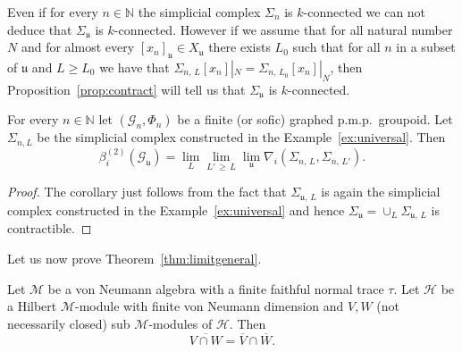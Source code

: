 \documentclass[AHL,Unicode,longabstracts,published]{cedram}
\newcommand{\Nmath}{\mathbb{N}}
\newcommand{\cM}{\mathcal{M}}
\newcommand{\cH}{\mathcal{H}}
\newcommand{\cg}{\mathcal{G}}
\newcommand{\uu}{\mathfrak{u}}
\newcommand{\ul}{\mathfrak{u}}
\newcommand{\pmp}{p.m.p.\ }
\begin{document}
\begin{rema}
Even if for every $n\in\Nmath$ the simplicial complex $\Sigma_n$ is $k$-connected we can not deduce that $\Sigma_\ul$ is $k$-connected. However if we assume that for all natural number $N$ and for almost every $[x_n]_\ul\in X_\ul$ there exists $L_0$ such that for all $n$ in a subset of $\ul$ and $L\geq L_0$ we have that $\Sigma_{n,\,L}[x_n]|_N=\Sigma_{n,\,L_0}[x_n]|_N$, then Proposition~\ref{prop:contract} will tell us that $\Sigma_\ul$ is $k$-connected.
\end{rema}

\begin{coro}
For every $n\in\Nmath$ let $(\cg_n,\Phi_n)$ be a finite (or sofic) graphed \pmp groupoid. Let $\Sigma_{n,L}$ be the simplicial complex constructed in the Example~\ref{ex:universal}. Then
\[
\beta^{(2)}_i(\cg_\ul) = \lim_{L} \lim_{L'\,\geq\,L} \lim_\uu \nabla_i\left(\Sigma_{n,\,L},\Sigma_{n,\,L'}\right).
\]
\end{coro}
\begin{proof}
The corollary just follows from the fact that $\Sigma_{\ul,\,L}$ is again the simplicial complex constructed in the Example~\ref{ex:universal} and hence $\Sigma_\ul=\cup_L\Sigma_{\ul,\,L}$ is contractible.
\end{proof}

Let us now prove Theorem~\ref{thm:limitgeneral}.

\begin{lemm}\label{lem:vNdimension}
Let $\cM$ be a von Neumann algebra with a finite faithful normal trace $\tau$. Let $\cH$ be a Hilbert $\cM$-module with finite von Neumann dimension and $V,W$ (not necessarily closed) sub $\cM$-modules of $\cH$. Then
\[
\overline{V \cap W} = \overline{V} \cap \overline{W}.
\]
\end{lemm}
\end{document}
